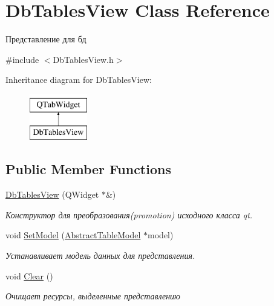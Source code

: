\hypertarget{class_db_tables_view}{}\section{Db\+Tables\+View Class Reference}
\label{class_db_tables_view}


Представление для бд  




{\ttfamily \#include $<$Db\+Tables\+View.\+h$>$}

Inheritance diagram for Db\+Tables\+View\+:\begin{figure}[H]
\begin{center}
\leavevmode
\includegraphics[height=2.000000cm]{class_db_tables_view}
\end{center}
\end{figure}
\subsection*{Public Member Functions}
\begin{DoxyCompactItemize}
\item 
\mbox{\hyperlink{class_db_tables_view_a822d3b44cd293111709021a5f6d6799d}{Db\+Tables\+View}} (Q\+Widget $\ast$\&)
\begin{DoxyCompactList}\small\item\em Конструктор для преобразования(promotion) исходного класса qt. \end{DoxyCompactList}\item 
void \mbox{\hyperlink{class_db_tables_view_a24b72d529ce83a644f3b2e491f864111}{Set\+Model}} (\mbox{\hyperlink{class_abstract_table_model}{Abstract\+Table\+Model}} $\ast$model)
\begin{DoxyCompactList}\small\item\em Устанавливает модель данных для представления. \end{DoxyCompactList}\item 
\mbox{\label{class_db_tables_view_accf2ebff029e84812e48ca6564b392ef}} 
void \mbox{\hyperlink{class_db_tables_view_accf2ebff029e84812e48ca6564b392ef}{Clear}} ()
\begin{DoxyCompactList}\small\item\em Очищает ресурсы, выделенные представлению \end{DoxyCompactList}\end{DoxyCompactItemize}


